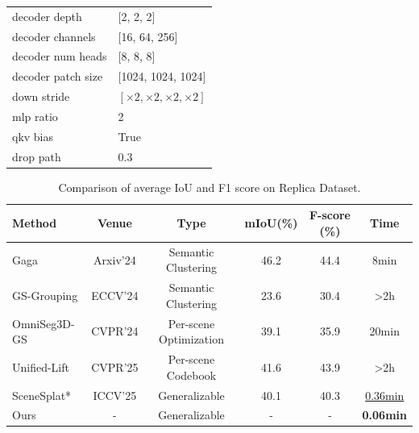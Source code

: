 \begin{table}[htbp]
\begin{minipage}[t]{0.48\textwidth}
{\begin{tabular}{l|l}
    decoder depth & [2, 2, 2] \\
    decoder channels & [16, 64, 256] \\
    decoder num heads & [8, 8, 8] \\
    decoder patch size & [1024, 1024, 1024] \\
    down stride & $[\times 2, \times 2, \times 2, \times 2]$ \\
    mlp ratio & 2 \\
    qkv bias & True \\
    drop path & 0.3 \\
    \bottomrule
    \end{tabular}}
    \end{minipage}
\end{table}

\iffalse
\begin{table}[htbp]
\caption{Comparison of average IoU and F1 score on Replica Dataset.}
\begin{center}
\begin{tabular}{l|c|c|cc|c}
\toprule
Method & Venue & Type & mIoU(\%) & F-score (\%) & Time \\
\midrule
Gaga \cite{lyu2024gaga} & Arxiv'24 & Semantic Clustering & 46.2 & 44.4 & 8min\\ %
GS-Grouping \cite{ye2024gaussian} & ECCV'24 & Semantic Clustering & 23.6 & 30.4 & >2h\\
OmniSeg3D-GS \cite{ying2023omniseg3d} & CVPR'24 & Per-scene Optimization & 39.1 & 35.9 & 20min\\ %
Unified-Lift \cite{zhu2025rethinking}& CVPR'25 & Per-scene Codebook & 41.6 & 43.9 & >2h\\

\midrule
SceneSplat* \cite{li2025scenesplat}& ICCV'25 & Generalizable & 40.1 & 40.3 & \underline{0.36min}\\
Ours & - & Generalizable & - & - & \textbf{0.06min}\\
\bottomrule
\end{tabular}
\label{tab: LERF}
\end{center}
\end{table}

